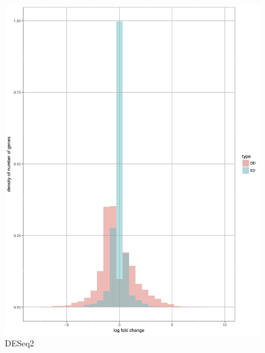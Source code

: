 \documentclass[11pt]{amsart}
\begin{document}
\begin{figure}[ht]
  \includegraphics[width=\linewidth]{DEC_EC_des.png}
  \caption{DESeq2}\label{fig:DESeq2}
\endminipage
\end{figure}
\end{document}
